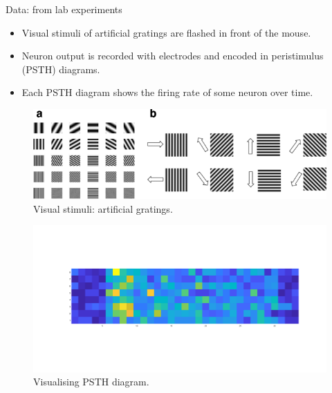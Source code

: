 \documentclass[xcolor={dvipsnames,svgnames}]{beamer}
\begin{document}

\begin{frame}{Data: from lab experiments}
    \begin{itemize}
        \item Visual stimuli of artificial gratings are flashed in front of the mouse.
        \item Neuron output is recorded with electrodes and encoded in peristimulus (PSTH) diagrams.
        \item Each PSTH diagram shows the firing rate of some neuron over time.
    \end{itemize} 
        \begin{minipage}{0.5\textwidth}
    \begin{figure}[H]
        \centering
            \includegraphics[width=\textwidth]{figures-retina-results/stimuli.png}
            \caption{Visual stimuli: artificial gratings.}
    \end{figure}
    \end{minipage}
    \begin{minipage}{.4\textwidth}  
   \begin{figure}
        \centering
            \includegraphics[width=\textwidth]{figures-retina-results/psth.png}
            \caption{Visualising PSTH diagram.}
    \end{figure}
    \end{minipage}%
\end{frame}
\end{document}
